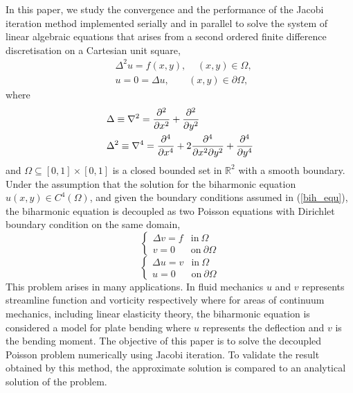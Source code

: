 In this paper, we study the convergence and the performance of the Jacobi iteration method implemented serially and in parallel to solve the system of linear algebraic equations that arises from a second ordered finite difference discretisation on a Cartesian unit square,\\
\begin{equation}\label{bih_equ}
\begin{split}
&\Delta^2 u =  f(x,y),  \;\;\;\;(x,y)\in\Omega,\\
&u = 0 = \Delta u,  \;\;\;\;\;\;\;(x,y) \in \partial{\Omega},
\end{split}
\end{equation}
where
\begin{align*}
&\Delta \equiv \nabla^2 = \pderiv[2]{}{x} + \pderiv[2]{}{y}\\
&\Delta^2\equiv\nabla^4 =\pderiv[4]{}{x} + 2\frac{\partial^4}{\partial{x^2}\partial{y^2}} + \pderiv[4]{}{y}
\end{align*}
and $\Omega \subseteq [0,1]\times[0,1]$ is a closed bounded set in $\mathbb{R}^2$ with a smooth boundary.\\
Under the assumption that the  solution for the biharmonic equation $u(x,y)\in C^{4}(\Omega)$, and given the boundary conditions assumed in (\ref{bih_equ}), the biharmonic equation is decoupled as two Poisson equations with Dirichlet boundary condition on the same domain,\\
\[\begin{cases}
\Delta v = f  & \mbox{in}\ \Omega \\
v = 0  & \mbox{on}\ \partial{\Omega}
\end{cases}\]
\[ \begin{cases}
\Delta u = v  & \mbox{in}\ \Omega \\
 u = 0  & \mbox{on}\ \partial{\Omega}
\end{cases}\]
This problem arises in many applications. In fluid mechanics $u$ and $v$ represents streamline function and vorticity respectively where for areas of continuum mechanics, including linear elasticity theory, the biharmonic equation is considered a model for plate bending where $u$ represents the deflection and $v$ is the bending moment.
The objective of this paper is to solve the decoupled Poisson problem numerically using Jacobi iteration. To validate the result obtained by this method, the approximate solution is compared to an analytical solution of the problem.

